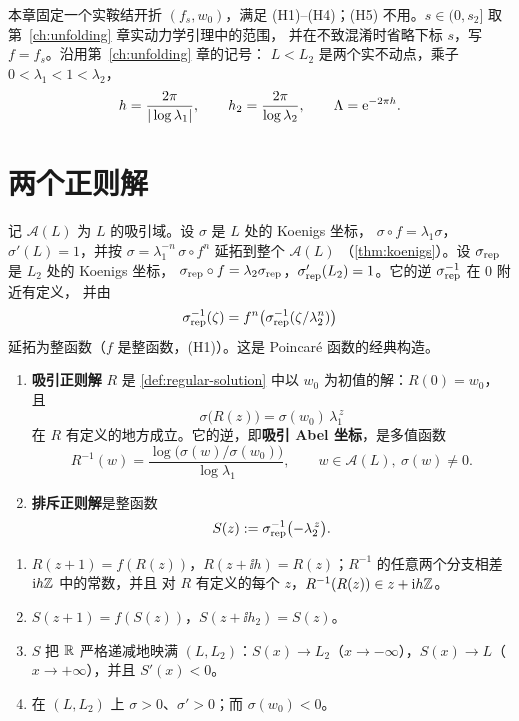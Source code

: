 本章固定一个实鞍结开折 $(f_s,w_0)$，满足 (H1)--(H4)；(H5) 不用。$s\in(0,s_2]$ 取第~\ref{ch:unfolding} 章实动力学引理中的范围，
并在不致混淆时省略下标 $s$，写 $f=f_s$。沿用第~\ref{ch:unfolding} 章的记号：
$L<L_2$ 是两个实不动点，乘子 $0<\lambda_1<1<\lambda_2$，
\[
 h=\frac{2\pi}{|\log\lambda_1|},\qquad h_2=\frac{2\pi}{\log\lambda_2},\qquad \Lambda=\mathrm{e}^{-2\pi h}.
\]

\section{两个正则解}\label{ch5:sec:RS}

记 $\mathcal A(L)$ 为 $L$ 的吸引域。设 $\sigma$ 是 $L$ 处的 Koenigs 坐标，
$\sigma\circ f=\lambda_1\sigma$，$\sigma'(L)=1$，并按 $\sigma=\lambda_1^{-n}\,\sigma\circ f^n$ 延拓到整个 $\mathcal A(L)$
（\cref{thm:koenigs}）。设 $\sigma_{\rm rep}$ 是 $L_2$ 处的 Koenigs 坐标，
$\sigma_{\rm rep}\circ f=\lambda_2\sigma_{\rm rep}$，$\sigma_{\rm rep}'(L_2)=1$。它的逆 $\sigma_{\rm rep}^{-1}$ 在 $0$ 附近有定义，
并由
\[
 \sigma_{\rm rep}^{-1}(\zeta)=f^n\bigl(\sigma_{\rm rep}^{-1}(\zeta/\lambda_2^n)\bigr)
\]
延拓为整函数（$f$ 是整函数，(H1)）。这是 Poincaré 函数的经典构造。

\begin{definition}[两个正则解]\label{ch5:def:RS}
\begin{enumerate}
\item \textbf{吸引正则解} $R$ 是 \cref{def:regular-solution} 中以 $w_0$ 为初值的解：$R(0)=w_0$，且
  \begin{equation}\label{ch5:eq:sigmaR}
   \sigma\bigl(R(z)\bigr)=\sigma(w_0)\,\lambda_1^{\,z}
  \end{equation}
  在 $R$ 有定义的地方成立。它的逆，即\textbf{吸引 Abel 坐标}，是多值函数
  \begin{equation}\label{ch5:eq:Rinv}
   R^{-1}(w)=\frac{\log\bigl(\sigma(w)/\sigma(w_0)\bigr)}{\log\lambda_1},\qquad w\in\mathcal A(L),\ \sigma(w)\ne0 .
  \end{equation}
\item \textbf{排斥正则解}是整函数
  \begin{equation}\label{ch5:eq:S}
   S(z):=\sigma_{\rm rep}^{-1}\bigl(-\lambda_2^{\,z}\bigr).
  \end{equation}
\end{enumerate}
\end{definition}

\begin{lemma}[两个正则解的基本性质]\label{ch5:lem:RS}
\begin{enumerate}
\item $R(z+1)=f(R(z))$，$R(z+\ii h)=R(z)$；$R^{-1}$ 的任意两个分支相差 $\mathrm{i} h\mathbb{Z}$ 中的常数，并且
  对 $R$ 有定义的每个 $z$，$R^{-1}(R(z))\in z+\mathrm{i} h\mathbb{Z}$。
\item $S(z+1)=f(S(z))$，$S(z+\ii h_2)=S(z)$。
\item $S$ 把 $\mathbb{R}$ 严格递减地映满 $(L,L_2)$：$S(x)\to L_2$（$x\to-\infty$），$S(x)\to L$（$x\to+\infty$），并且 $S'(x)<0$。
\item 在 $(L,L_2)$ 上 $\sigma>0$、$\sigma'>0$；而 $\sigma(w_0)<0$。
\end{enumerate}
\end{lemma}

